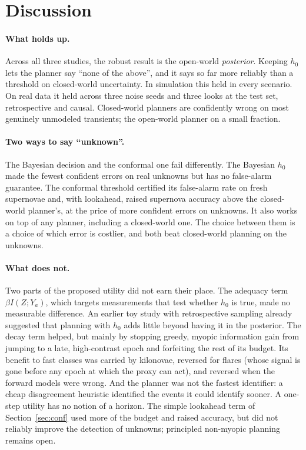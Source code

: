 \section{Discussion}\label{sec:disc}
\paragraph{What holds up.} Across all three studies, the robust result is the open-world \emph{posterior}. Keeping $h_0$ lets the planner say ``none of the above'', and it says so far more reliably than a threshold on closed-world uncertainty. In simulation this held in every scenario. On real data it held across three noise seeds and three looks at the test set, retrospective and causal. Closed-world planners are confidently wrong on most genuinely unmodeled transients; the open-world planner on a small fraction.

\paragraph{Two ways to say ``unknown''.} The Bayesian decision and the conformal one fail differently. The Bayesian $h_0$ made the fewest confident errors on real unknowns but has no false-alarm guarantee. The conformal threshold certified its false-alarm rate on fresh supernovae and, with lookahead, raised supernova accuracy above the closed-world planner's, at the price of more confident errors on unknowns. It also works on top of any planner, including a closed-world one. The choice between them is a choice of which error is costlier, and both beat closed-world planning on the unknowns.

\paragraph{What does not.} Two parts of the proposed utility did not earn their place. The adequacy term $\beta I(Z;Y_a)$, which targets measurements that test whether $h_0$ is true, made no measurable difference. An earlier toy study with retrospective sampling already suggested that planning with $h_0$ adds little beyond having it in the posterior. The decay term helped, but mainly by stopping greedy, myopic information gain from jumping to a late, high-contrast epoch and forfeiting the rest of its budget. Its benefit to fast classes was carried by kilonovae, reversed for flares (whose signal is gone before any epoch at which the proxy can act), and reversed when the forward models were wrong. And the planner was not the fastest identifier: a cheap disagreement heuristic identified the events it could identify sooner. A one-step utility has no notion of a horizon. The simple lookahead term of Section~\ref{sec:conf} used more of the budget and raised accuracy, but did not reliably improve the detection of unknowns; principled non-myopic planning remains open.

